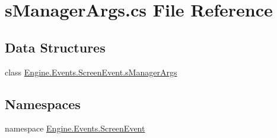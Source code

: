 \hypertarget{a00071}{}\section{s\+Manager\+Args.\+cs File Reference}
\label{a00071}
\subsection*{Data Structures}
\begin{DoxyCompactItemize}
\item 
class \hyperlink{a00386}{Engine.\+Events.\+Screen\+Event.\+s\+Manager\+Args}
\end{DoxyCompactItemize}
\subsection*{Namespaces}
\begin{DoxyCompactItemize}
\item 
namespace \hyperlink{a00249}{Engine.\+Events.\+Screen\+Event}
\end{DoxyCompactItemize}
